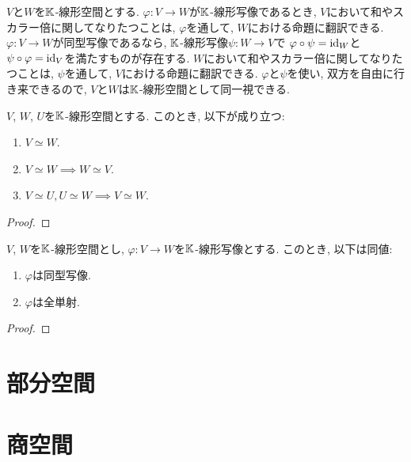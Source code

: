 \begin{remark}
  $V$と$W$を$\mathbb{K}$-線形空間とする.
  $\varphi\colon V\to W$が$\mathbb{K}$-線形写像であるとき,
  $V$において和やスカラー倍に関してなりたつことは,
  $\varphi$を通して, $W$における命題に翻訳できる.
  $\varphi\colon V\to W$が同型写像であるなら,
  $\mathbb{K}$-線形写像$\psi\colon W\to V$で
  $\varphi\circ \psi=\operatorname{id}_W$と
  $\psi\circ \varphi=\operatorname{id}_V$を満たすものが存在する.
  $W$において和やスカラー倍に関してなりたつことは,
  $\psi$を通して, $V$における命題に翻訳できる.
  $\varphi$と$\psi$を使い, 双方を自由に行き来できるので,
  $V$と$W$は$\mathbb{K}$-線形空間として同一視できる.
\end{remark}

\begin{prop}
  $V$, $W$, $U$を$\mathbb{K}$-線形空間とする.
  このとき, 以下が成り立つ:
  \begin{enumerate}
  \item $V\simeq W$.
  \item $V\simeq W \implies W\simeq V$.
  \item $V\simeq U, U\simeq W \implies V\simeq W$.
  \end{enumerate}
\end{prop}
\begin{proof}\end{proof}

\begin{prop}
  $V$, $W$を$\mathbb{K}$-線形空間とし, $\varphi\colon V\to W$を$\mathbb{K}$-線形写像とする.
  このとき, 以下は同値:
  \begin{enumerate}
  \item $\varphi$は同型写像.
  \item $\varphi$は全単射.
  \end{enumerate}
\end{prop}
\begin{proof}\end{proof}

\begin{quiz}
\end{quiz}

\chapter{部分空間}

\begin{quiz}
\end{quiz}

\chapter{商空間}
\begin{quiz}
\end{quiz}
